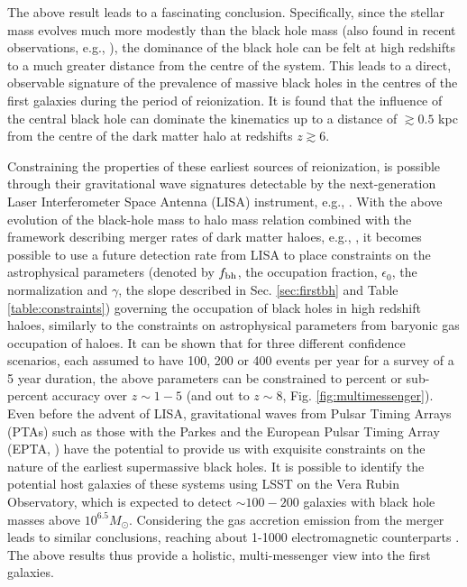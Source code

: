 The above result leads to a fascinating conclusion. Specifically, since the stellar mass evolves much more modestly than the black hole mass (also found in recent observations, e.g., \cite{venemans2016, decarli2018}), the dominance of the black hole can be felt at high redshifts to a much greater distance from the centre of the system. This leads to a 
 direct, observable signature \cite{hploebbh2020} of the prevalence of massive black holes in the centres of the first galaxies during the period of reionization. It is found that the influence of the central black hole can dominate the kinematics  up to a distance of $\gtrsim 0.5$ kpc from the centre of the dark matter halo at redshifts $z \gtrsim 6$.


Constraining the properties of these earliest sources of reionization, is possible through their gravitational wave signatures detectable by the next-generation Laser Interferometer Space Antenna (LISA) instrument, e.g., \cite{gair2011}. With the above evolution of the black-hole mass to halo mass relation combined with the framework describing merger rates of dark matter haloes, e.g., \cite{fakhouri2010}, it becomes possible to use a future detection rate from LISA to place constraints on the astrophysical parameters (denoted by $f_{\rm bh}$, the occupation fraction, $\epsilon_0$, the normalization and $\gamma$, the slope  described in Sec. \ref{sec:firstbh} and Table \ref{table:constraints}) governing the occupation of black holes in high redshift haloes, similarly to the constraints on astrophysical parameters from baryonic gas occupation of haloes. It can be shown \cite{hploeblisa2020c} that for three different confidence scenarios, each assumed to have 100, 200 or 400 events per year for a survey of a 5 year duration, the above parameters can be constrained to percent or sub-percent accuracy over $z \sim 1-5$ (and out to $z \sim 8$, Fig. \ref{fig:multimessenger}). Even before the advent of LISA, gravitational waves from Pulsar Timing Arrays (PTAs) such as those with the Parkes and the European Pulsar Timing Array (EPTA, \cite{babak2016}) have the potential to provide us with exquisite constraints on the nature of the earliest supermassive black holes. It is possible to identify the potential host galaxies of these systems using LSST on the Vera Rubin Observatory, which is expected to detect $\sim 100-200$ galaxies with black hole masses above $10^{6.5} M_{\odot}$. Considering the gas accretion emission from the merger leads to similar conclusions, reaching about 1-1000 electromagnetic counterparts \cite{kocsis2006}. The above results thus provide a holistic, multi-messenger view into the first galaxies. 



